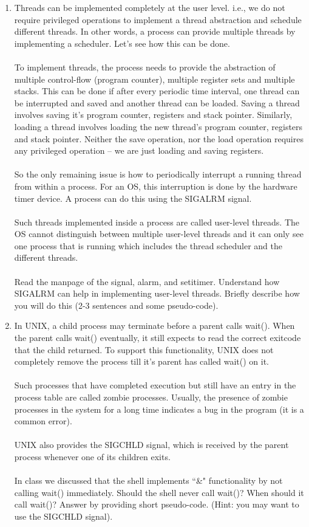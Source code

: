 \begin{enumerate}
\item
Threads can be implemented completely at the user level. i.e., we do not require privileged operations to implement a thread abstraction and schedule different threads. In other words, a process can provide multiple threads by implementing a scheduler. Let's see how this can be done.
\\\\
To implement threads, the process needs to provide the abstraction of multiple control-flow (program counter), multiple register sets and multiple stacks. This can be done if after every periodic time interval, one thread can be interrupted and saved and another thread can be loaded. Saving a thread involves saving it's program counter, registers and stack pointer. Similarly, loading a thread involves loading the new thread's program counter, registers and stack pointer. Neither the save operation, nor the load operation requires any privileged operation -- we are just loading and saving registers.
\\\\
So the only remaining issue is how to periodically interrupt a running thread from within a process. For an OS, this interruption is done by the hardware timer device. A process can do this using the SIGALRM signal.
\\\\
Such threads implemented inside a process are called user-level threads. The OS cannot distinguish between multiple user-level threads and it can only see one process that is running which includes the thread scheduler and the different threads.
\\\\
Read the manpage of the signal, alarm, and setitimer. Understand how SIGALRM can help in
implementing user-level threads. Briefly describe how you will do
this (2-3 sentences and some pseudo-code). 

\item
In UNIX, a child process may terminate before a parent calls wait(). When the parent calls wait() eventually, it still expects to read the correct exitcode that the child returned. To support this functionality, UNIX does not completely remove the process till it's parent has called wait() on it.
\\\\
Such processes that have completed execution but still have an entry in the process table are called zombie processes. Usually, the presence of zombie processes in the system for a long time indicates a bug in the program (it is a common error).
\\\\
UNIX also provides the SIGCHLD signal, which is received by the parent process whenever one of
its children exits.
\\\\
In class we discussed that the shell implements ``\&" functionality by not
calling wait() immediately. Should the shell never call wait()? When should it call wait()? Answer by providing short pseudo-code. (Hint: you may want to use the SIGCHLD signal).

\end{enumerate}

